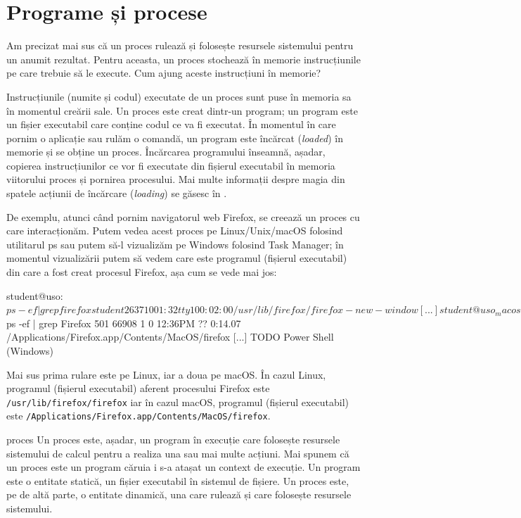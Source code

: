 \section{Programe și procese}
\label{sec:procese-v-programe}

Am precizat mai sus că un proces rulează și folosește resursele sistemului
pentru un anumit rezultat. Pentru aceasta, un proces stochează în memorie
instrucțiunile pe care trebuie să le execute. Cum ajung aceste instrucțiuni în
memorie?

Instrucțiunile (numite și codul) executate de un proces sunt puse în memoria sa
în momentul creării sale. Un proces este creat dintr-un program; un program este
un fișier executabil care conține codul ce va fi executat. În momentul în care
pornim o aplicație sau rulăm o comandă, un program este încărcat
(\textit{loaded}) în memorie și se obține un proces. Încărcarea programului
înseamnă, așadar, copierea instrucțiunilor ce vor fi executate din fișierul
executabil în memoria viitorului proces și pornirea procesului. Mai multe
informații despre magia din spatele acțiunii de încărcare (\textit{loading}) se
găsesc în .

De exemplu, atunci când pornim navigatorul web Firefox, se creează un proces cu
care interacționăm. Putem vedea acest proces pe Linux/Unix/macOS folosind
utilitarul ps sau putem să-l vizualizăm pe Windows folosind Task Manager; în
momentul vizualizării putem să vedem care este programul (fișierul executabil)
din care a fost creat procesul Firefox, așa cum se vede mai jos:

\begin{screen}
student@uso:~$ ps -ef | grep firefox
student   2637     1  0 01:32 tty1     00:02:00 /usr/lib/firefox/firefox -new-window
[...]
student@uso_macos:~$ ps -ef | grep Firefox
501 66908     1   0 12:36PM ??         0:14.07 /Applications/Firefox.app/Contents/MacOS/firefox
[...]
TODO Power Shell (Windows)
\end{screen}

Mai sus prima rulare este pe Linux, iar a doua pe macOS. În cazul Linux, programul (fișierul executabil) aferent procesului Firefox este \texttt{/usr/lib/firefox/firefox} iar în cazul macOS, programul (fișierul executabil) este \texttt{/Applications/Firefox.app/Contents/MacOS/firefox}.

\begin{definition}{proces}
Un proces este, așadar, un program în execuție care folosește resursele
sistemului de calcul pentru a realiza una sau mai multe acțiuni. Mai
spunem că un proces este un program căruia i s-a atașat un context de
execuție. Un program este o entitate statică, un fișier executabil în
sistemul de fișiere. Un proces este, pe de altă parte, o entitate
dinamică, una care rulează și care folosește resursele sistemului.
\end{definition}

